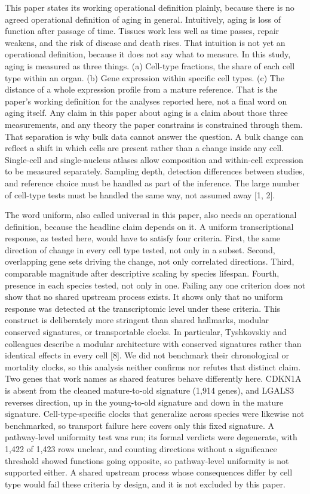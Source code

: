 \documentclass[11pt]{article}
\begin{document}
This paper states its working operational definition plainly, because there is no agreed operational definition of aging in general. Intuitively, aging is loss of function after passage of time. Tissues work less well as time passes, repair weakens, and the risk of disease and death rises. That intuition is not yet an operational definition, because it does not say what to measure. In this study, aging is measured as three things. (a) Cell-type fractions, the share of each cell type within an organ. (b) Gene expression within specific cell types. (c) The distance of a whole expression profile from a mature reference. That is the paper's working definition for the analyses reported here, not a final word on aging itself. Any claim in this paper about aging is a claim about those three measurements, and any theory the paper constrains is constrained through them. That separation is why bulk data cannot answer the question. A bulk change can reflect a shift in which cells are present rather than a change inside any cell. Single-cell and single-nucleus atlases allow composition and within-cell expression to be measured separately. Sampling depth, detection differences between studies, and reference choice must be handled as part of the inference. The large number of cell-type tests must be handled the same way, not assumed away [1, 2].

The word uniform, also called universal in this paper, also needs an operational definition, because the headline claim depends on it. A uniform transcriptional response, as tested here, would have to satisfy four criteria. First, the same direction of change in every cell type tested, not only in a subset. Second, overlapping gene sets driving the change, not only correlated directions. Third, comparable magnitude after descriptive scaling by species lifespan. Fourth, presence in each species tested, not only in one. Failing any one criterion does not show that no shared upstream process exists. It shows only that no uniform response was detected at the transcriptomic level under these criteria. This construct is deliberately more stringent than shared hallmarks, modular conserved signatures, or transportable clocks. In particular, Tyshkovskiy and colleagues describe a modular architecture with conserved signatures rather than identical effects in every cell [8]. We did not benchmark their chronological or mortality clocks, so this analysis neither confirms nor refutes that distinct claim. Two genes that work names as shared features behave differently here. CDKN1A is absent from the cleaned mature-to-old signature (1,914 genes), and LGALS3 reverses direction, up in the young-to-old signature and down in the mature signature. Cell-type-specific clocks that generalize across species were likewise not benchmarked, so transport failure here covers only this fixed signature. A pathway-level uniformity test was run; its formal verdicts were degenerate, with 1,422 of 1,423 rows unclear, and counting directions without a significance threshold showed functions going opposite, so pathway-level uniformity is not supported either. A shared upstream process whose consequences differ by cell type would fail these criteria by design, and it is not excluded by this paper.
\end{document}
